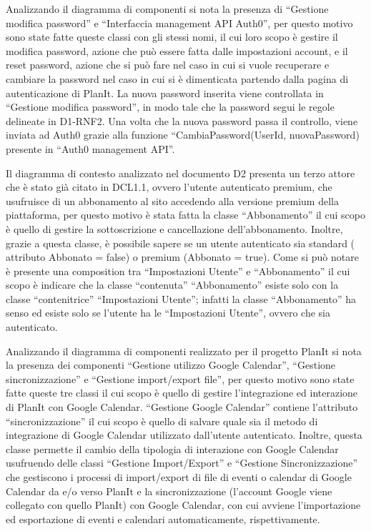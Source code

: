 \begin{listaPersonale}[DCL]{}
\begin{listaPersonale2}[DCL]{}
        Analizzando il diagramma di componenti si nota la presenza di “Gestione modifica password” e “Interfaccia management API Auth0”, per questo motivo sono state fatte queste classi con gli stessi nomi, il cui loro scopo è gestire il modifica password, azione che può essere fatta dalle impostazioni account, e il reset password, azione che si può fare nel caso in cui si vuole recuperare e cambiare la password nel caso in cui si è dimenticata partendo dalla pagina di autenticazione di PlanIt. La nuova password inserita viene controllata in “Gestione modifica password”, in modo tale che la password segui le regole delineate in D1-RNF2. Una volta che la nuova password passa il controllo, viene inviata ad Auth0 grazie alla funzione “CambiaPassword(UserId, nuovaPassword) presente in “Auth0 management API”.


        Il diagramma di contesto analizzato nel documento D2 presenta un terzo attore che è stato già citato in DCL1.1, ovvero l'utente autenticato premium, che usufruisce di un abbonamento al sito accedendo alla versione premium della piattaforma, per questo motivo è stata fatta la classe “Abbonamento” il cui scopo è quello di gestire la sottoscrizione e cancellazione dell'abbonamento. Inoltre, grazie a questa classe, è possibile sapere se un utente autenticato sia standard ( attributo Abbonato = false) o premium (Abbonato = true). Come si può notare è presente una composition tra “Impostazioni Utente” e “Abbonamento” il cui scopo è indicare che la classe “contenuta” “Abbonamento” esiste solo con la classe “contenitrice” “Impostazioni Utente”; infatti la classe “Abbonamento” ha senso ed esiste solo se l'utente ha le “Impostazioni Utente”, ovvero che sia autenticato.


        Analizzando il diagramma di componenti realizzato per il progetto PlanIt si nota la presenza dei componenti “Gestione utilizzo Google Calendar”, “Gestione sincronizzazione” e “Gestione import/export file”, per questo motivo sono state fatte queste tre classi il cui scopo è quello di gestire l'integrazione ed interazione di PlanIt con Google Calendar. “Gestione Google Calendar” contiene l'attributo “sincronizzazione” il cui scopo è quello di salvare quale sia il metodo di integrazione di Google Calendar utilizzato dall'utente autenticato. Inoltre, questa classe permette il cambio della tipologia di interazione con Google Calendar usufruendo delle classi “Gestione Import/Export” e “Gestione Sincronizzazione” che gestiscono i processi di import/export di file di eventi o calendar di Google Calendar da e/o verso PlanIt e la sincronizzazione (l'account Google viene collegato con quello PlanIt) con Google Calendar, con cui avviene l'importazione ed esportazione di eventi e calendari automaticamente, rispettivamente.



\end{listaPersonale2}
\end{listaPersonale}

